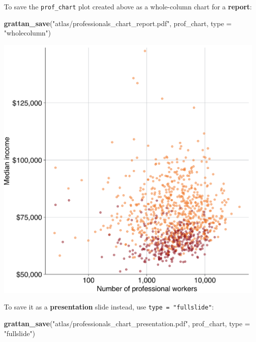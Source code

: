 \documentclass[
]{book}
\newenvironment{Shaded}{\begin{snugshade}}{\end{snugshade}}
\newcommand{\DataTypeTok}[1]{\textcolor[rgb]{0.13,0.29,0.53}{#1}}
\newcommand{\KeywordTok}[1]{\textcolor[rgb]{0.13,0.29,0.53}{\textbf{#1}}}
\newcommand{\NormalTok}[1]{#1}
\newcommand{\StringTok}[1]{\textcolor[rgb]{0.31,0.60,0.02}{#1}}
\begin{document}
To save the \texttt{prof\_chart} plot created above as a whole-column chart for a \textbf{report}:

\begin{Shaded}
\begin{Highlighting}[]
\KeywordTok{grattan\_save}\NormalTok{(}\StringTok{"atlas/professionals\_chart\_report.pdf"}\NormalTok{, prof\_chart, }\DataTypeTok{type =} \StringTok{"wholecolumn"}\NormalTok{)}
\end{Highlighting}
\end{Shaded}

\includegraphics[width=38.76in]{atlas/professionals_chart_report}

To save it as a \textbf{presentation} slide instead, use \texttt{type\ =\ "fullslide"}:

\begin{Shaded}
\begin{Highlighting}[]
\KeywordTok{grattan\_save}\NormalTok{(}\StringTok{"atlas/professionals\_chart\_presentation.pdf"}\NormalTok{, prof\_chart, }\DataTypeTok{type =} \StringTok{"fullslide"}\NormalTok{)}
\end{Highlighting}
\end{Shaded}
\end{document}

